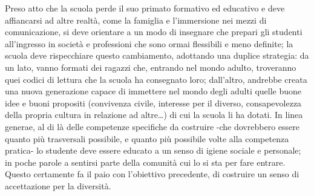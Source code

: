 \documentclass{article}
\begin{document}
Preso atto che la scuola perde il suo primato formativo ed educativo e deve affiancarsi ad altre realtà, come la famiglia e l'immersione nei mezzi di comunicazione, si deve orientare a un modo di insegnare che prepari gli studenti all'ingresso in società e professioni che sono ormai flessibili e meno definite; la scuola deve rispecchiare questo cambiamento, adottando una duplice strategia: da un lato, vanno formati dei ragazzi che, entrando nel mondo adulto, troveranno quei codici di lettura che la scuola ha consegnato loro; dall'altro, andrebbe creata una nuova generazione capace di immettere nel mondo degli adulti quelle buone idee e buoni propositi (convivenza civile, interesse per il diverso, consapevolezza della propria cultura in relazione ad altre\dots) di cui la scuola li ha dotati.
In linea generae, al di là delle competenze specifiche da costruire -che dovrebbero essere quanto più trasversali possibile, e quanto più possibile volte alla competenza pratica- lo studente deve essere educato a un senso di igiene sociale e personale; in poche parole a sentirsi parte della comunità cui lo si sta per fare entrare. Questo certamente fa il paio con l'obiettivo precedente, di costruire un senso di accettazione per la diversità.
\end{document}
